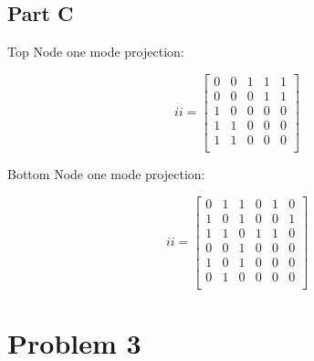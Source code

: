 \documentclass[12pt]{article}
\begin{document}
\subsection*{Part C}

Top Node one mode projection:

\[
ii = \begin{bmatrix}
0 & 0 & 1 & 1 & 1 \\
0 & 0 & 0 & 1 & 1 \\
1 & 0 & 0 & 0 & 0 \\
1 & 1 & 0 & 0 & 0 \\
1 & 1 & 0 & 0 & 0 \\
\end{bmatrix}
\]

\noindent Bottom Node one mode projection:

\[
ii = \begin{bmatrix}
0 & 1 & 1 & 0 & 1 & 0 \\
1 & 0 & 1 & 0 & 0 & 1 \\
1 & 1 & 0 & 1 & 1 & 0 \\
0 & 0 & 1 & 0 & 0 & 0 \\
1 & 0 & 1 & 0 & 0 & 0 \\
0 & 1 & 0 & 0 & 0 & 0 \\
\end{bmatrix}
\]

\section*{Problem 3}

\end{document}
